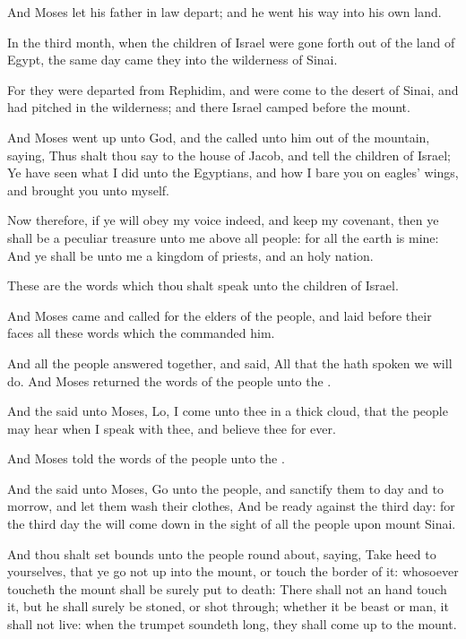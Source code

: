 \Verse And Moses let his father in law depart; and he went his way into his own land.

\Chapter
\Verse In the third month, when the children of Israel were gone forth out of the land of Egypt, the same day came they into the wilderness of Sinai.

\Verse For they were departed from Rephidim, and were come to the desert of Sinai, and had pitched in the wilderness; and there Israel camped before the mount.

\Verse And Moses went up unto God, and the \LORD called unto him out of the mountain, saying, Thus shalt thou say to the house of Jacob, and tell the children of Israel; \Verse Ye have seen what I did unto the Egyptians, and how I bare you on eagles' wings, and brought you unto myself.

\Verse Now therefore, if ye will obey my voice indeed, and keep my covenant, then ye shall be a peculiar treasure unto me above all people: for all the earth is mine: \Verse And ye shall be unto me a kingdom of priests, and an holy nation.

These are the words which thou shalt speak unto the children of Israel.

\Verse And Moses came and called for the elders of the people, and laid before their faces all these words which the \LORD commanded him.

\Verse And all the people answered together, and said, All that the \LORD hath spoken we will do. And Moses returned the words of the people unto the \LORD.

\Verse And the \LORD said unto Moses, Lo, I come unto thee in a thick cloud, that the people may hear when I speak with thee, and believe thee for ever.

And Moses told the words of the people unto the \LORD.

\Verse And the \LORD said unto Moses, Go unto the people, and sanctify them to day and to morrow, and let them wash their clothes, \Verse And be ready against the third day: for the third day the \LORD will come down in the sight of all the people upon mount Sinai.

\Verse And thou shalt set bounds unto the people round about, saying, Take heed to yourselves, that ye go not up into the mount, or touch the border of it: whosoever toucheth the mount shall be surely put to death: \Verse There shall not an hand touch it, but he shall surely be stoned, or shot through; whether it be beast or man, it shall not live: when the trumpet soundeth long, they shall come up to the mount.


